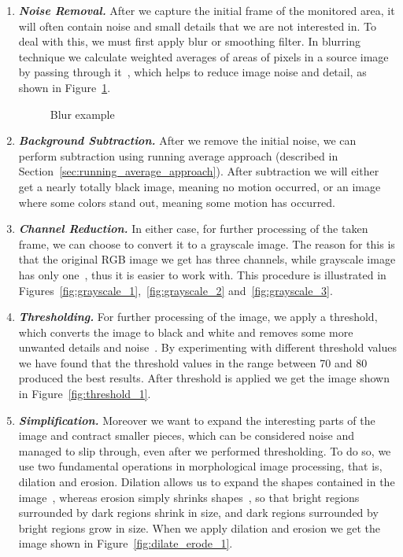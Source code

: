 	\begin{enumerate}
	\item \textit{\textbf{Noise Removal.}} After we capture the initial frame of the monitored area, it will often contain noise and small details that we are not interested in. To deal with this, we must first apply blur or smoothing filter. In blurring technique we calculate weighted averages of areas of pixels in a source image by passing through it~\cite{blur_1}, which helps to reduce image noise and detail, as shown in Figure~\ref{fig:blur_example}.
	\begin{figure}[htb]
		\centering
		\quad
		\caption{Blur example}
		\label{fig:blur_example}
	\end{figure}
	
	\item \textit{\textbf{Background Subtraction.}} After we remove the initial noise, we can perform subtraction using running average approach (described in Section~\ref{sec:running_average_approach}). After subtraction we will either get a nearly totally black image, meaning no motion occurred, or an image where some colors stand out, meaning some motion has occurred. 
	
	\item \textit{\textbf{Channel Reduction.}} In either case, for further processing of the taken frame, we can choose to convert it to a grayscale image. The reason for this is that the original RGB image we get has three channels, while grayscale image has only one~\cite{grayscale_1}, thus it is easier to work with. This procedure is illustrated in Figures~\ref{fig:grayscale_1},~\ref{fig:grayscale_2} and~\ref{fig:grayscale_3}. 
	
	\item \textit{\textbf{Thresholding.}} For further processing of the image, we apply a threshold, which converts the image to black and white and removes some more unwanted details and noise~\cite{threshold_1}. By experimenting with different threshold values we have found that the threshold values in the range between 70 and 80 produced the best results. After threshold is applied we get the image shown in Figure~\ref{fig:threshold_1}. 
	
	\item \textit{\textbf{Simplification.}} Moreover we want to expand the interesting parts of the image and contract smaller pieces, which can be considered noise and managed to slip through, even after we performed thresholding. To do so, we use two fundamental operations in morphological image processing, that is, dilation and erosion. Dilation allows us to expand the shapes contained in the image~\cite{dilation_1}, whereas erosion simply shrinks shapes~\cite{erosion_1}, so that bright regions surrounded by dark regions shrink in size, and dark regions surrounded by bright regions grow in size. When we apply dilation and erosion we get the image shown in Figure~\ref{fig:dilate_erode_1}. 
	

\end{enumerate}
